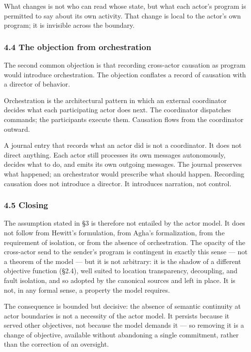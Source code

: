 \documentclass[
]{article}
\begin{document}
What changes is not who can read whose state, but what each actor's
program is permitted to say about its own activity. That change is local
to the actor's own program; it is invisible across the boundary.

\subsubsection{4.4 The objection from
orchestration}\label{the-objection-from-orchestration}

The second common objection is that recording cross-actor causation as
program would introduce orchestration. The objection conflates a record
of causation with a director of behavior.

Orchestration is the architectural pattern in which an external
coordinator decides what each participating actor does next. The
coordinator dispatches commands; the participants execute them.
Causation flows from the coordinator outward.

A journal entry that records what an actor did is not a coordinator. It
does not direct anything. Each actor still processes its own messages
autonomously, decides what to do, and emits its own outgoing messages.
The journal preserves what happened; an orchestrator would prescribe
what should happen. Recording causation does not introduce a director.
It introduces narration, not control.

\subsubsection{4.5 Closing}\label{closing}

The assumption stated in §3 is therefore not entailed by the actor
model. It does not follow from Hewitt's formulation, from Agha's
formalization, from the requirement of isolation, or from the absence of
orchestration. The opacity of the cross-actor send to the sender's
program is contingent in exactly this sense --- not a theorem of the
model --- but it is not arbitrary: it is the shadow of a different
objective function (§2.4), well suited to location transparency,
decoupling, and fault isolation, and so adopted by the canonical sources
and left in place. It is not, in any formal sense, a property the model
requires.

The consequence is bounded but decisive: the absence of semantic
continuity at actor boundaries is not a necessity of the actor model. It
persists because it served other objectives, not because the model
demands it --- so removing it is a change of objective, available
without abandoning a single commitment, rather than the correction of an
oversight.
\end{document}
